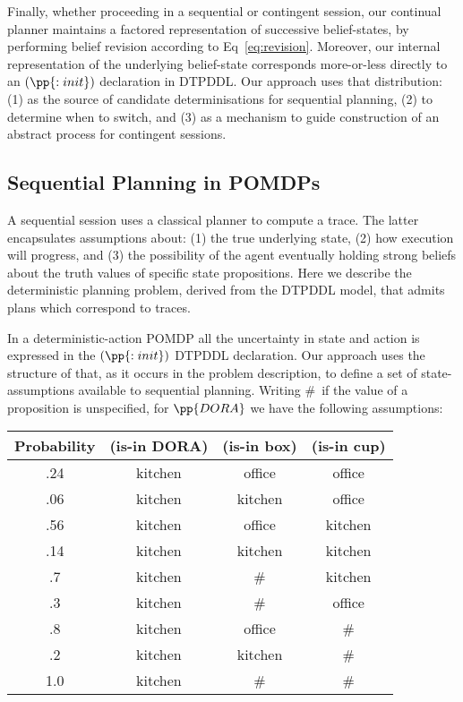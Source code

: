Finally, whether proceeding in a sequential or contingent session, our
continual planner maintains a factored representation of successive
belief-states, by performing belief revision according to
Eq~\ref{eq:revision}. Moreover, our internal representation of the
underlying belief-state corresponds more-or-less directly to an
$(\pp{:init})$ declaration in DTPDDL. Our approach uses that
distribution: (1) as the source of candidate determinisations for
sequential planning, (2) to determine when to switch, and (3) as a
mechanism to guide construction of an abstract process for contingent
sessions.



\subsection{Sequential Planning in POMDPs}

A sequential session uses a classical planner to compute a trace. The
latter encapsulates assumptions about: (1) the true underlying state,
(2) how execution will progress, and (3) the possibility of the agent
eventually holding strong beliefs about the truth values of specific
state propositions. Here we describe the deterministic planning
problem, derived from the DTPDDL model, that admits plans which
correspond to traces.

In a deterministic-action POMDP all the uncertainty in state and
action is expressed in the $(\pp{:init})$ DTPDDL declaration. Our
approach uses the structure of that, as it occurs in the problem
description, to define a set of state-assumptions available to
sequential planning.
Writing \#\ if the value of a proposition is unspecified, for
$\pp{DORA}$ we have the following assumptions:

\small
\begin{tabular}{cccc}
\hline
Probability & (is-in DORA)  & (is-in box)  & (is-in cup) \\
\hline
.24 & kitchen & office & office \\
.06 & kitchen & kitchen & office \\
.56 & kitchen & office & kitchen \\
.14 & kitchen & kitchen & kitchen \\
.7 & kitchen & \# &  kitchen\\
.3 & kitchen & \# & office \\
.8 & kitchen & office & \# \\
.2 & kitchen & kitchen & \# \\
1.0 & kitchen & \# & \# \\
\hline
\end{tabular}
\normalsize

